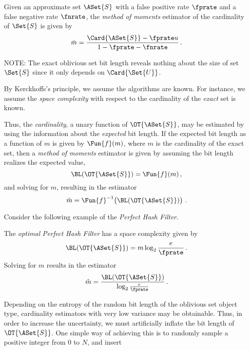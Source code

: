 \documentclass[ ../main.tex]{subfiles}
\begin{document}
Given an approximate set $\ASet{S}$ with a false positive rate $\fprate$ and a false negative rate $\fnrate$, the \emph{method of moments} estimator of the cardinality of $\Set{S}$ is given by
\begin{equation}
\label{eq:exp_St_finite}
    \hat{m} = \frac{\Card{\ASet{S}} - \fprate u}{1 - \fprate - \fnrate}\,.
\end{equation}















NOTE: The exact oblivious set bit length reveals nothing about the size of set $\Set{S}$ since it only depends on $\Card{\Set{U}}$.


By Kerckhoffs's principle, we assume the algorithms are known. For instance, we assume the \emph{space complexity} with respect to the cardinality of the \emph{exact} set is known.

Thus, the \emph{cardinality}, a unary function of $\OT{\ASet{S}}$, may be estimated by using the information about the \emph{expected} bit length. If the expected bit length as a function of $m$ is given by $\Fun{f}(m)$, where $m$ is the cardinality of the exact set, then a \emph{method of moments} estimator is given by assuming the bit length realizes the expected value,
\begin{equation}
    \BL(\OT{\ASet{S}}) = \Fun{f}(m)\,,
\end{equation}
and solving for $m$, resulting in the estimator
\begin{equation}
    \hat{m} = \Fun{f}^{-1}\!\left(\BL(\OT{\ASet{S}})\right)\,.
\end{equation}

Consider the following example of the \emph{Perfect Hash Filter}\cite{phf}.
\begin{example}
The \emph{optimal} \emph{Perfect Hash Filter} has a space complexity given by
\begin{equation}
    \BL(\OT{\ASet{S}}) = m \log_2 \frac{e}{\fprate}\,.
\end{equation}
Solving for $m$ results in the estimator
\begin{equation}
    \hat{m} = \frac{\BL(\OT{\ASet{S}})}{\log_2 \frac{e}{\fprate}}\,.
\end{equation}
\end{example}
Depending on the entropy of the random bit length of the oblivious set object type, cardinality estimators with very low variance may be obtainable. Thus, in order to increase the uncertainty, we must artificially inflate the bit length of $\OT{\ASet{S}}$. One simple way of achieving this is to randomly sample a positive integer from $0$ to $N$, and insert 
\end{document}
